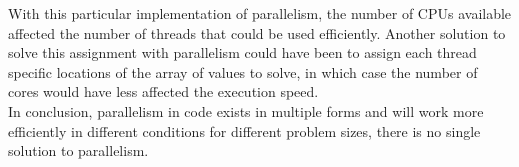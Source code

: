 \documentclass[letterpaper,12pt]{article}
\begin{document}
With this particular implementation of parallelism, the number of CPUs available affected the number of threads that could be used efficiently. Another solution to solve this assignment with parallelism could have been to assign each thread specific locations of the array of values to solve, in which case the number of cores would have less affected the execution speed.\\

In conclusion, parallelism in code exists in multiple forms and will work more efficiently in different conditions for different problem sizes, there is no single solution to parallelism.



\newpage




\end{document}

